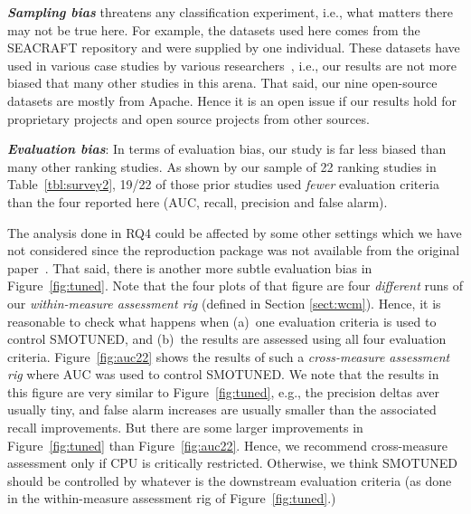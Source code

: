 \documentclass[sigconf,review, anonymous]{acmart}
\theoremstyle{break}
\theoremstyle{break}
\newcommand{\tion}[1]{{Section }\ref{sect:#1}}
\newcommand{\smb}{{\sc SMOTUNED}}
\begin{document}
\textbf{\textit{Sampling bias}} threatens any classification experiment, i.e., what matters there may not be true here. For example, the datasets used here comes from the SEACRAFT repository and were supplied by one individual. These datasets have used in various case studies by various researchers~\cite{he2012investigation,peters2013better,peters2013balancing,turhan2013empirical}, i.e., our results are not more biased that many other studies in this arena.
That said, our nine open-source datasets   are mostly from Apache. Hence
it is an open issue if our results hold for
 proprietary projects and open source projects from other sources.


\textbf{\textit{Evaluation bias}}: In terms of evaluation bias,
our study is far less biased than many other ranking studies.  As shown by our sample of
22 ranking studies in
Table~\ref{tbl:survey2}, 19/22 of those prior studies used {\em fewer} evaluation criteria
than the four reported here (AUC, recall, precision and false alarm). 

The analysis done in RQ4 could be affected by some other settings which we have not considered since the reproduction package was not available from the original paper~\cite{bennin2017mahakil}.
That said, there is another more subtle evaluation bias in  Figure~\ref{fig:tuned}. Note that the four plots of that figure are four {\em different} runs of our  {\em within-measure assessment rig}
(defined in \tion{wcm}). Hence, it is reasonable to check what happens when (a)~one
evaluation criteria is used to control {\smb}, and (b)~the results are assessed
using all four evaluation criteria. 
Figure~\ref{fig:auc22} shows the results of such a {\em cross-measure assessment rig} where AUC was used to control {\smb}. We note that the results in this figure are very similar to Figure~\ref{fig:tuned}, e.g., the precision deltas aver usually tiny, and false alarm increases are usually smaller than the associated recall improvements. But there are some larger improvements in Figure~\ref{fig:tuned}
than Figure~\ref{fig:auc22}. Hence, we recommend cross-measure assessment only if CPU is critically restricted. Otherwise, we think {\smb} should be controlled by whatever is the downstream evaluation criteria
(as done in the within-measure assessment rig of Figure~\ref{fig:tuned}.)
\end{document}
